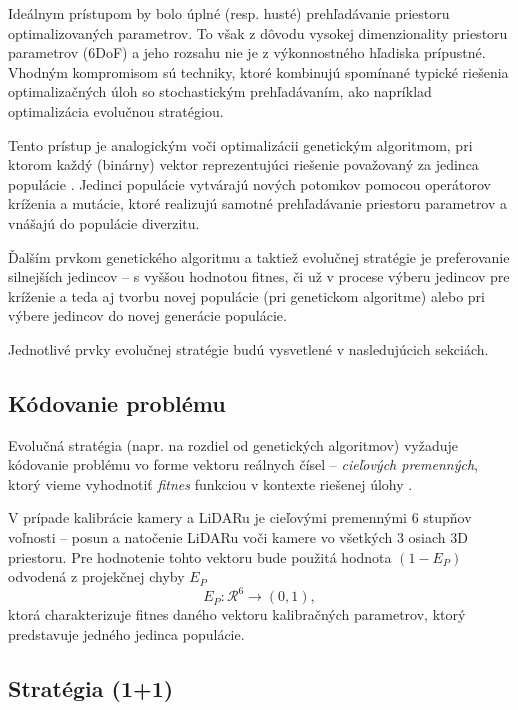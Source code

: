 \documentclass[12pt, a4paper]{article}
\begin{document}
Ideálnym prístupom by bolo úplné (resp. husté) prehľadávanie priestoru optimalizovaných parametrov. To však z dôvodu vysokej dimenzionality priestoru parametrov ($6$DoF) a jeho rozsahu nie je z výkonnostného hľadiska prípustné. Vhodným kompromisom sú techniky, ktoré kombinujú spomínané typické riešenia optimalizačných úloh so stochastickým prehľadávaním, ako napríklad optimalizácia evolučnou stratégiou.

Tento prístup je analogickým voči optimalizácii genetickým algoritmom, pri ktorom každý (binárny) vektor reprezentujúci riešenie považovaný za jedinca populácie \cite{kvasnicka}. Jedinci populácie vytvárajú nových potomkov pomocou operátorov kríženia a mutácie, ktoré realizujú samotné prehľadávanie priestoru parametrov a vnášajú do populácie diverzitu.

Ďalším prvkom genetického algoritmu a taktiež evolučnej stratégie je preferovanie silnejších jedincov -- s vyššou hodnotou fitnes, či už v procese výberu jedincov pre kríženie a teda aj tvorbu novej populácie (pri genetickom algoritme) alebo pri výbere jedincov do novej generácie populácie. 

Jednotlivé prvky evolučnej stratégie budú vysvetlené v nasledujúcich sekciách.

\subsection{Kódovanie problému}

Evolučná stratégia (napr. na rozdiel od genetických algoritmov) vyžaduje kódovanie problému vo forme vektoru reálnych čísel -- \emph{cieľových premenných}, ktorý vieme vyhodnotiť \emph{fitnes} funkciou v kontexte riešenej úlohy \cite{kvasnicka}.

V prípade kalibrácie kamery a LiDARu je cieľovými premennými $6$ stupňov voľnosti -- posun a natočenie LiDARu voči kamere vo všetkých $3$ osiach $3$D priestoru. Pre hodnotenie tohto vektoru bude použitá hodnota $(1-E_P)$ odvodená z projekčnej chyby $E_P$
\begin{equation}
	E_P: \mathcal{R}^6 \rightarrow (0,1),
\end{equation}
ktorá charakterizuje fitnes daného vektoru kalibračných parametrov, ktorý predstavuje jedného jedinca populácie.

\subsection{Stratégia (1+1)}
\end{document}
